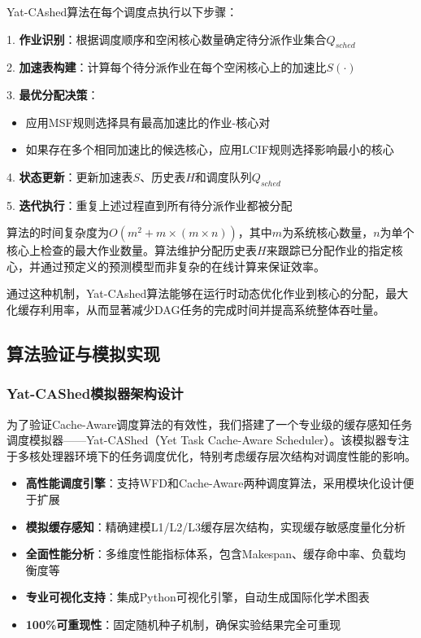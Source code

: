 Yat-CAshed算法在每个调度点执行以下步骤：

1. \textbf{作业识别}：根据调度顺序和空闲核心数量确定待分派作业集合$Q_{sched}$

2. \textbf{加速表构建}：计算每个待分派作业在每个空闲核心上的加速比$S(\cdot)$

3. \textbf{最优分配决策}：
   \begin{itemize}
       \item 应用MSF规则选择具有最高加速比的作业-核心对
       \item 如果存在多个相同加速比的候选核心，应用LCIF规则选择影响最小的核心
   \end{itemize}

4. \textbf{状态更新}：更新加速表$S$、历史表$H$和调度队列$Q_{sched}$

5. \textbf{迭代执行}：重复上述过程直到所有待分派作业都被分配

算法的时间复杂度为$O(m^2 + m \times (m \times n))$，其中$m$为系统核心数量，$n$为单个核心上检查的最大作业数量。算法维护分配历史表$H$来跟踪已分配作业的指定核心，并通过预定义的预测模型而非复杂的在线计算来保证效率。

通过这种机制，Yat-CAshed算法能够在运行时动态优化作业到核心的分配，最大化缓存利用率，从而显著减少DAG任务的完成时间并提高系统整体吞吐量。

\subsection{算法验证与模拟实现}

\subsubsection{Yat-CAShed模拟器架构设计}

为了验证Cache-Aware调度算法的有效性，我们搭建了一个专业级的缓存感知任务调度模拟器——Yat-CAShed（Yet Task Cache-Aware Scheduler）。该模拟器专注于多核处理器环境下的任务调度优化，特别考虑缓存层次结构对调度性能的影响。

\begin{tcolorbox}[
    colback=blue!5!white,
    colframe=blue!50!black,
    title=\textbf{Yat-CAShed模拟器核心特性},
    fonttitle=\bfseries,
    arc=3pt
]
\begin{itemize}
    \item \textbf{高性能调度引擎}：支持WFD和Cache-Aware两种调度算法，采用模块化设计便于扩展
    \item \textbf{模拟缓存感知}：精确建模L1/L2/L3缓存层次结构，实现缓存敏感度量化分析
    \item \textbf{全面性能分析}：多维度性能指标体系，包含Makespan、缓存命中率、负载均衡度等
    \item \textbf{专业可视化支持}：集成Python可视化引擎，自动生成国际化学术图表
    \item \textbf{100\%可重现性}：固定随机种子机制，确保实验结果完全可重现
\end{itemize}
\end{tcolorbox}


